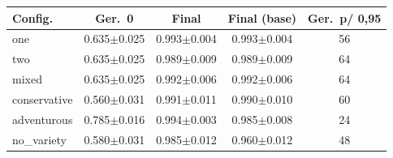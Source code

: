 \begin{tabular}{lcccc}
\hline
Config. & Ger.\ 0 & Final & Final (base) & Ger.\ p/ 0,95 \\
\hline
one & 0.635$\pm$0.025 & 0.993$\pm$0.004 & 0.993$\pm$0.004 & 56 \\
two & 0.635$\pm$0.025 & 0.989$\pm$0.009 & 0.989$\pm$0.009 & 64 \\
mixed & 0.635$\pm$0.025 & 0.992$\pm$0.006 & 0.992$\pm$0.006 & 64 \\
conservative & 0.560$\pm$0.031 & 0.991$\pm$0.011 & 0.990$\pm$0.010 & 60 \\
adventurous & 0.785$\pm$0.016 & 0.994$\pm$0.003 & 0.985$\pm$0.008 & 24 \\
no\_variety & 0.580$\pm$0.031 & 0.985$\pm$0.012 & 0.960$\pm$0.012 & 48 \\
\hline
\end{tabular}
